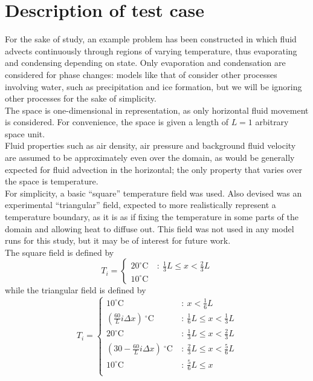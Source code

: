\documentclass[11pt]{article}
\begin{document}
\section{Description of test case}
For the sake of study, an example problem has been constructed in which fluid advects continuously through regions of varying temperature, thus evaporating and condensing depending on state. Only evaporation and condensation are considered for phase changes: models like that of \citet{Tiedtke1993} consider other processes involving water, such as precipitation and ice formation, but we will be ignoring other processes for the sake of simplicity. \\
The space is one-dimensional in representation, as only horizontal fluid movement is considered. For convenience, the space is given a length of $L=1$ arbitrary space unit. \\
Fluid properties such as air density, air pressure and background fluid velocity are assumed to be approximately even over the domain, as would be generally expected for fluid advection in the horizontal; the only property that varies over the space is temperature. \\
For simplicity, a basic ``square'' temperature field was used. Also devised was an experimental ``triangular'' field, expected to more realistically represent a temperature boundary, as it is as if fixing the temperature in some parts of the domain and allowing heat to diffuse out. This field was not used in any model runs for this study, but it may be of interest for future work. \\
The square field is defined by
\begin{equation}
T_i = \begin{cases}
20^{\circ}\text{C} & ~:~ \frac{1}{3}L \leq x < \frac{2}{3}L \\
10^{\circ}\text{C} & ~
\end{cases} \label{eq:square_field}
\end{equation}
while the triangular field is defined by
\begin{equation}
T_i = \begin{cases}
10^{\circ}\text{C} & ~:~ x < \frac{1}{6}L \\
\left(\frac{60}{L}i\Delta x\right) ~^{\circ}\text{C} & ~:~ \frac{1}{6}L \leq x < \frac{1}{3}L \\
20^{\circ}\text{C} & ~:~ \frac{1}{3}L \leq x < \frac{2}{3}L \\
\left(30-\frac{60}{L}i\Delta x\right) ~^{\circ}\text{C} & ~:~ \frac{2}{3}L \leq x < \frac{5}{6}L \\
10^{\circ}\text{C} & ~:~ \frac{5}{6}L \leq x \\
\end{cases} \label{eq:triangular_field}
\end{equation}
\end{document}
